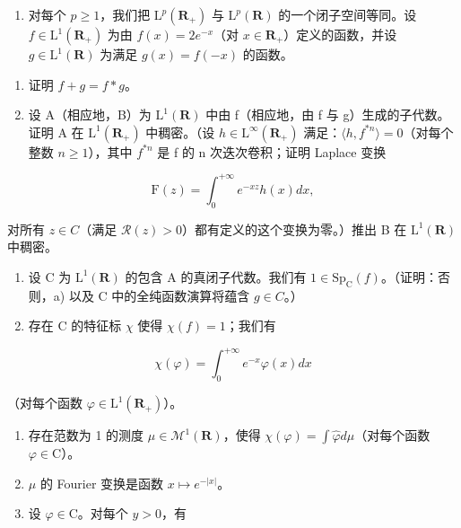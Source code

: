 \begin{enumerate}
\def\labelenumi{\arabic{enumi})}
\setcounter{enumi}{16}
\tightlist
\item
  对每个 \(p \geqslant 1\)，我们把 \(\mathrm{L}^p(\mathbf{R}_+)\) 与 \(\mathrm{L}^p(\mathbf{R})\) 的一个闭子空间等同。设 \(f \in \mathrm{L}^1(\mathbf{R}_+)\) 为由 \(f(x) = 2e^{-x}\)（对 \(x \in \mathbf{R}_+\)）定义的函数，并设 \(g \in \mathrm{L}^1(\mathbf{R})\) 为满足 \(g(x) = f(-x)\) 的函数。
\end{enumerate}

\begin{enumerate}
\def\labelenumi{\alph{enumi})}
\item
  证明 \(f + g = f * g\)。
\item
  设 A（相应地，B）为 \(\mathrm{L}^{1}(\mathbf{R})\) 中由 f（相应地，由 f 与 g）生成的子代数。证明 A 在 \(\mathrm{L}^{1}(\mathbf{R}_{+})\) 中稠密。（设 \(h \in \mathrm{L}^{\infty}(\mathbf{R}_{+})\) 满足：\(\langle h, f^{*n} \rangle = 0\)（对每个整数 \(n \geqslant 1\)），其中 \(f^{*n}\) 是 f 的 n 次迭次卷积；证明 Laplace 变换
\end{enumerate}

\[
\mathrm{F} (z) = \int_ {0} ^ {+ \infty} e ^ {- x z} h (x) d x,
\]

对所有 \(z \in C\)（满足 \(\mathcal{R}(z) > 0\)）都有定义的这个变换为零。）推出 B 在 \(\mathrm{L}^{1}(\mathbf{R})\) 中稠密。

\begin{enumerate}
\def\labelenumi{\alph{enumi})}
\setcounter{enumi}{2}
\item
  设 C 为 \(\mathrm{L}^{1}(\mathbf{R})\) 的包含 A 的真闭子代数。我们有 \(1 \in \mathrm{Sp}_{\mathrm{C}}(f)\)。（证明：否则，a) 以及 C 中的全纯函数演算将蕴含 \(g \in C\)。）
\item
  存在 C 的特征标 \(\chi\) 使得 \(\chi(f)=1\)；我们有
\end{enumerate}

\[
\chi (\varphi) = \int_ {0} ^ {+ \infty} e ^ {- x} \varphi (x) d x
\]

（对每个函数 \(\varphi\in\mathrm{L}^{1}(\mathbf{R}_{+})\)）。

\begin{enumerate}
\def\labelenumi{\alph{enumi})}
\setcounter{enumi}{4}
\item
  存在范数为 1 的测度 \(\mu \in \mathcal{M}^1 (\mathbf{R})\)，使得 \(\chi (\varphi) = \int \widehat{\varphi} d\mu\)（对每个函数 \(\varphi \in \mathrm{C}\)）。
\item
  \(\mu\) 的 Fourier 变换是函数 \(x \mapsto e^{-|x|}\)。
\item
  设 \(\varphi \in \mathrm{C}\)。对每个 \(y > 0\)，有
\end{enumerate}


